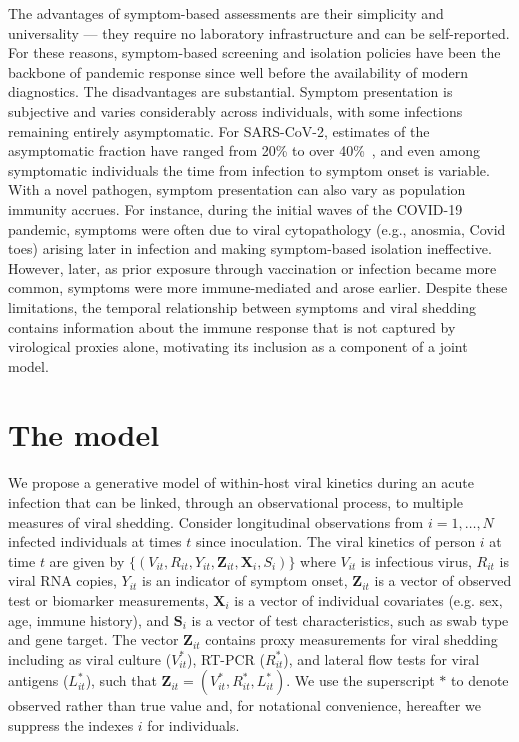 \documentclass[12pt]{article}
\begin{document}
The advantages of symptom-based assessments are their simplicity and universality --- they require no laboratory infrastructure and can be self-reported. For these reasons, symptom-based screening and isolation policies have been the backbone of pandemic response since well before the availability of modern diagnostics. The disadvantages are substantial. Symptom presentation is subjective and varies considerably across individuals, with some infections remaining entirely asymptomatic. For SARS-CoV-2, estimates of the asymptomatic fraction have ranged from 20\% to over 40\%~\cite{oran2020prevalence,buitrago2020occurrence}, and even among symptomatic individuals the time from infection to symptom onset is variable. With a novel pathogen, symptom presentation can also vary as population immunity accrues. For instance, during the initial waves of the COVID-19 pandemic, symptoms were often due to viral cytopathology (e.g., anosmia, Covid toes) arising later in infection and making symptom-based isolation ineffective. However, later, as prior exposure through vaccination or infection became more common, symptoms were more immune-mediated and arose earlier. Despite these limitations, the temporal relationship between symptoms and viral shedding contains information about the immune response that is not captured by virological proxies alone, motivating its inclusion as a component of a joint model.

\section{The model} \label{sec:model}
We propose a generative model of within-host viral kinetics during an acute infection that can be linked, through an observational process, to multiple measures of viral shedding. Consider longitudinal observations from $i = 1, \ldots, N$ infected individuals at times $t$ since inoculation. The viral kinetics of person $i$ at time $t$ are given by $\{(V_{it}, R_{it}, Y_{it}, \mathbf{Z}_{it}, \mathbf{X}_i, S_{i})\}$ where $V_{it}$ is infectious virus, $R_{it}$ is viral RNA copies, $Y_{it}$ is an indicator of symptom onset, $\mathbf{Z}_{it}$ is a vector of observed test or biomarker measurements, $\mathbf{X}_i$ is a vector of individual covariates (e.g. sex, age, immune history), and $\mathbf{S}_i$ is a vector of test characteristics, such as swab type and gene target. The vector $\mathbf{Z}_{it}$ contains proxy measurements for viral shedding including as viral culture ($V^*_{it}$), RT-PCR ($R^*_{it}$), and lateral flow tests for viral antigens ($L^*_{it}$), such that $\mathbf{Z}_{it} = (V^*_{it}, R^*_{it}, L^*_{it})$. We use the superscript $*$ to denote observed rather than true value and, for notational convenience, hereafter we suppress the indexes $i$ for individuals. 
\end{document}
